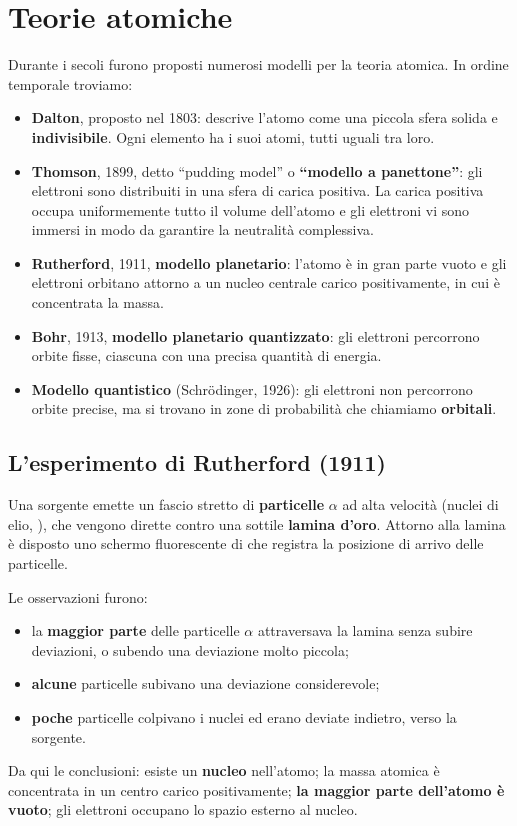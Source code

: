 \documentclass[11pt, a4paper, openright]{book}
\begin{document}
\section{Teorie atomiche}
Durante i secoli furono proposti numerosi modelli per la teoria atomica. In ordine temporale troviamo:
\begin{itemize}
    \item \textbf{Dalton}, proposto nel 1803: descrive l'atomo come una piccola sfera solida e \textbf{indivisibile}. Ogni elemento ha i suoi atomi, tutti uguali tra loro.
    \item \textbf{Thomson}, 1899, detto ``pudding model'' o \textbf{``modello a panettone''}: gli elettroni sono distribuiti in una sfera di carica positiva. La carica positiva occupa uniformemente tutto il volume dell'atomo e gli elettroni vi sono immersi in modo da garantire la neutralità complessiva.
    \item \textbf{Rutherford}, 1911, \textbf{modello planetario}: l'atomo è in gran parte vuoto e gli elettroni orbitano attorno a un nucleo centrale carico positivamente, in cui è concentrata la massa.
    \item \textbf{Bohr}, 1913, \textbf{modello planetario quantizzato}: gli elettroni percorrono orbite fisse, ciascuna con una precisa quantità di energia.
    \item \textbf{Modello quantistico} (Schrödinger, 1926): gli elettroni non percorrono orbite precise, ma si trovano in zone di probabilità che chiamiamo \textbf{orbitali}.
\end{itemize}

\subsection{L'esperimento di Rutherford (1911)}
Una sorgente emette un fascio stretto di \textbf{particelle} $\alpha$ ad alta velocità (nuclei di elio, ), che vengono dirette contro una sottile \textbf{lamina d'oro}. Attorno alla lamina è disposto uno schermo fluorescente di  che registra la posizione di arrivo delle particelle.

Le osservazioni furono:
\begin{itemize}
    \item la \textbf{maggior parte} delle particelle $\alpha$ attraversava la lamina senza subire deviazioni, o subendo una deviazione molto piccola;
    \item \textbf{alcune} particelle subivano una deviazione considerevole;
    \item \textbf{poche} particelle colpivano i nuclei ed erano deviate indietro, verso la sorgente.
\end{itemize}
Da qui le conclusioni: esiste un \textbf{nucleo} nell'atomo; la massa atomica è concentrata in un centro carico positivamente; \textbf{la maggior parte dell'atomo è vuoto}; gli elettroni occupano lo spazio esterno al nucleo.
\end{document}
